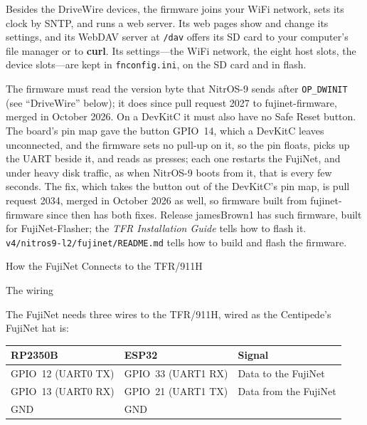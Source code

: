 \documentclass[10pt,twoside,openany]{book}
\makeatletter
\newcommand{\cmd}[1]{\textbf{#1}}            %
\newcommand{\file}[1]{\texttt{#1}}           %
\renewcommand{\section}{\@startsection{section}{1}{0pt}{3.2ex plus 1ex}{1.2ex}%
  {\sffamily\bfseries\large}}
\renewcommand{\subsection}{\@startsection{subsection}{2}{0pt}{2.4ex plus 0.6ex}{0.8ex}%
  {\sffamily\bfseries\normalsize}}
\makeatother
\begin{document}
Besides the DriveWire devices, the firmware joins your WiFi network, sets
its clock by SNTP, and runs a web server. Its web pages show and change
its settings, and its WebDAV server at \file{/dav} offers its SD card to
your computer's file manager or to \cmd{curl}. Its settings---the WiFi
network, the eight host slots, the device slots---are kept in
\file{fnconfig.ini}, on the SD card and in flash.

The firmware must read the version byte that NitrOS-9 sends after
\texttt{OP\_DWINIT} (see ``DriveWire'' below); it does since pull request
2027 to fujinet-firmware, merged in October 2026. On a DevKitC it must
also have no Safe Reset button. The board's pin map gave the button GPIO~14,
which a DevKitC leaves unconnected, and the firmware sets no pull-up on
it, so the pin floats, picks up the UART beside it, and reads as presses;
each one restarts the FujiNet, and under heavy disk traffic, as when
NitrOS-9 boots from it, that is every few seconds. The fix, which takes the
button out of the DevKitC's pin map, is pull request 2034, merged in
October 2026 as well, so firmware built from fujinet-firmware since then
has both fixes. Release jamesBrown1 has such firmware, built for
FujiNet-Flasher; the \emph{TFR Installation Guide} tells how to flash it.
\file{v4/nitros9-l2/fujinet/README.md} tells how to build and flash the
firmware.

\section{How the FujiNet Connects to the TFR/911H}

\subsection{The wiring}

The FujiNet needs three wires to the TFR/911H, wired as the Centipede's
FujiNet hat is:

\begin{tabularx}{\linewidth}{@{}l l >{\raggedright\arraybackslash}X@{}}
\toprule
\textbf{RP2350B} & \textbf{ESP32} & \textbf{Signal}\\
\midrule
GPIO~12 (UART0 TX) & GPIO~33 (UART1 RX) & Data to the FujiNet\\
GPIO~13 (UART0 RX) & GPIO~21 (UART1 TX) & Data from the FujiNet\\
GND & GND & \\
\bottomrule
\end{tabularx}
\end{document}
